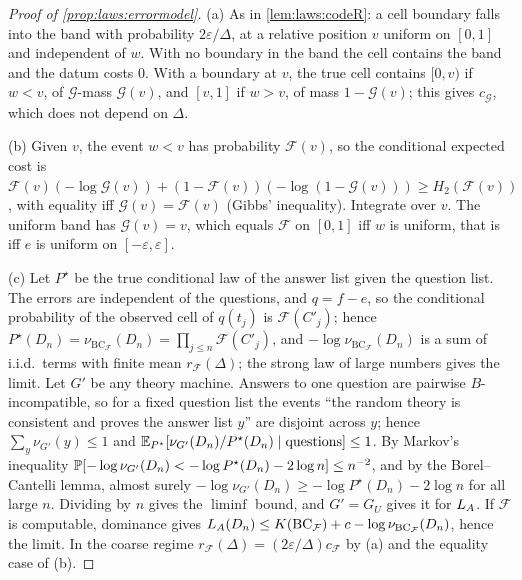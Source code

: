 \begin{proof}[Proof of \cref{prop:laws:errormodel}]
(a) As in \cref{lem:laws:codeR}: a cell boundary falls into the band with probability $2\varepsilon/\Delta$, at a relative position $v$ uniform on $[0,1]$ and independent of $w$. With no boundary in the band the cell contains the band and the datum costs $0$. With a boundary at $v$, the true cell contains $[0,v)$ if $w<v$, of $\mathcal G$-mass $\mathcal G(v)$, and $[v,1]$ if $w>v$, of mass $1-\mathcal G(v)$; this gives $c_{\mathcal G}$, which does not depend on $\Delta$.

(b) Given $v$, the event $w<v$ has probability $\mathcal F(v)$, so the conditional expected cost is $\mathcal F(v)(-\log\mathcal G(v))+(1-\mathcal F(v))(-\log(1-\mathcal G(v)))\ge H_2(\mathcal F(v))$, with equality iff $\mathcal G(v)=\mathcal F(v)$ (Gibbs' inequality). Integrate over $v$. The uniform band has $\mathcal G(v)=v$, which equals $\mathcal F$ on $[0,1]$ iff $w$ is uniform, that is iff $e$ is uniform on $[-\varepsilon,\varepsilon]$.

(c) Let $P^\star$ be the true conditional law of the answer list given the question list. The errors are independent of the questions, and $q=f-e$, so the conditional probability of the observed cell of $q(t_j)$ is $\mathcal F(C'_j)$; hence $P^\star(D_n)=\nu_{\mathrm{BC}_{\mathcal F}}(D_n)=\prod_{j\le n}\mathcal F(C'_j)$, and $-\log\nu_{\mathrm{BC}_{\mathcal F}}(D_n)$ is a sum of i.i.d.\ terms with finite mean $r_{\mathcal F}(\Delta)$; the strong law of large numbers gives the limit. Let $G'$ be any theory machine. Answers to one question are pairwise $B$-incompatible, so for a fixed question list the events ``the random theory is consistent and proves the answer list $y$'' are disjoint across $y$; hence $\sum_y\nu_{G'}(y)\le1$ and $\mathbb{E}_{P^\star}[\nu_{G'}(D_n)/P^\star(D_n)\mid\text{questions}]\le1$. By Markov's inequality $\mathbb{P}[-\log\nu_{G'}(D_n)<-\log P^\star(D_n)-2\log n]\le n^{-2}$, and by the Borel--Cantelli lemma, almost surely $-\log\nu_{G'}(D_n)\ge-\log P^\star(D_n)-2\log n$ for all large $n$. Dividing by $n$ gives the $\liminf$ bound, and $G'=G_U$ gives it for $L_{A}$. If $\mathcal F$ is computable, dominance gives $L_{A}(D_n)\le K(\mathrm{BC}_{\mathcal F})+c-\log\nu_{\mathrm{BC}_{\mathcal F}}(D_n)$, hence the limit. In the coarse regime $r_{\mathcal F}(\Delta)=(2\varepsilon/\Delta)c_{\mathcal F}$ by (a) and the equality case of (b).


\end{proof}
